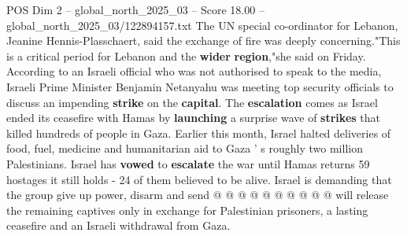 \begin{textsample}{POS Dim 2 – global\_north\_2025\_03 – Score 18.00 – global\_north\_2025\_03/122894157.txt}
The UN special co-ordinator for Lebanon, Jeanine Hennis-Plasschaert, said the exchange of fire was deeply concerning."This is a critical period for Lebanon and the \textbf{wider} \textbf{region},"she said on Friday.
According to an Israeli official who was not authorised to speak to the media, Israeli Prime Minister Benjamin Netanyahu was meeting top security officials to discuss an impending \textbf{strike} on the \textbf{capital}.
The \textbf{escalation} comes as Israel ended its ceasefire with Hamas by \textbf{launching} a surprise wave of \textbf{strikes} that killed hundreds of people in Gaza.
Earlier this month, Israel halted deliveries of food, fuel, medicine and humanitarian aid to Gaza ' s roughly two million Palestinians.
Israel has \textbf{vowed} to \textbf{escalate} the war until Hamas returns 59 hostages it still holds - 24 of them believed to be alive.
Israel is demanding that the group give up power, disarm and send @ @ @ @ @ @ @ @ @ @ will release the remaining captives only in exchange for Palestinian prisoners, a lasting ceasefire and an Israeli withdrawal from Gaza.

\end{textsample}
